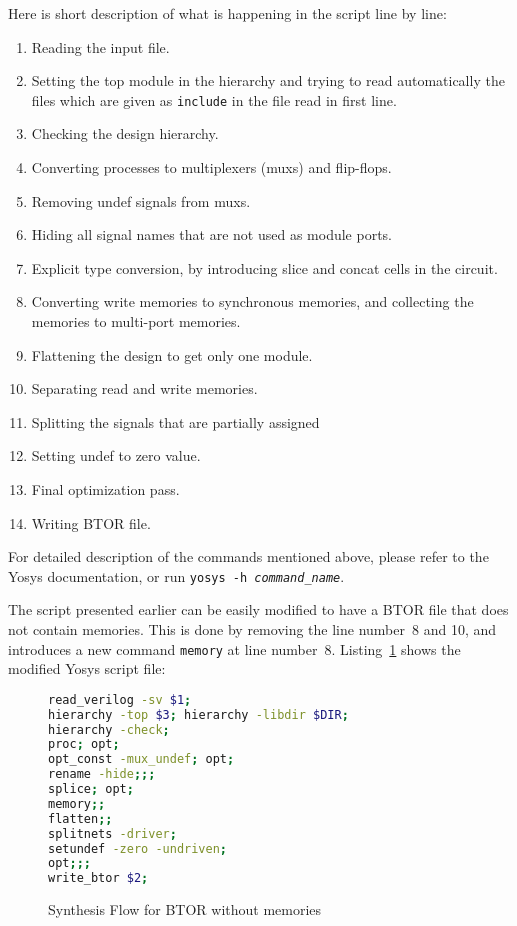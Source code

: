 \documentclass[9pt,technote,a4paper]{IEEEtran}
\begin{document}
Here is short description of what is happening in the script line by
line:

\begin{enumerate}
\item Reading the input file.
\item Setting the top module in the hierarchy and trying to read
  automatically the files which are given as {\tt include} in the file
  read in first line.
\item Checking the design hierarchy.
\item Converting processes to multiplexers (muxs) and flip-flops.
\item Removing undef signals from muxs.
\item Hiding all signal names that are not used as module ports.
\item Explicit type conversion, by introducing slice and concat cells
  in the circuit.
\item Converting write memories to synchronous memories, and
  collecting the memories to multi-port memories.
\item Flattening the design to get only one module.
\item Separating read and write memories.
\item Splitting the signals that are partially assigned 
\item Setting undef to zero value.
\item Final optimization pass.
\item Writing BTOR file.
\end{enumerate}

For detailed description of the commands mentioned above, please refer
to the Yosys documentation, or run {\tt yosys -h \it command\_name}.

The script presented earlier can be easily modified to have a BTOR
file that does not contain memories. This is done by removing the line
number~8 and 10, and introduces a new command {\tt memory} at line
number~8. Listing~\ref{btor_script_without_memory} shows the
modified Yosys script file:

\begin{figure}[H]
\begin{lstlisting}[language=sh,numbers=none]
read_verilog -sv $1; 
hierarchy -top $3; hierarchy -libdir $DIR; 
hierarchy -check; 
proc; opt; 
opt_const -mux_undef; opt;
rename -hide;;;
splice; opt;
memory;;
flatten;;
splitnets -driver;
setundef -zero -undriven;
opt;;;
write_btor $2;
\end{lstlisting}
 \renewcommand{\figurename}{Listing}
\caption{Synthesis Flow for BTOR without memories}
\label{btor_script_without_memory}
\end{figure}
\end{document}
